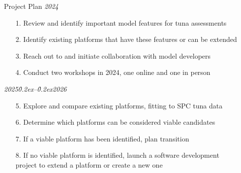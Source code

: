 \documentclass[aspectratio=169,fleqn]{beamer}
\begin{document}
\begin{frame}{Project Plan}\small
  \textit{2024}
  \begin{itemize}
    \item[1.] Review and identify important model features for tuna
    assessments\\[-1ex]
    \item[2.] Identify existing platforms that have these features or can be
    extended\\[-1ex]
    \item[3.] Reach out to and initiate collaboration with model
    developers\\[-1ex]
    \item[4.] Conduct two workshops in 2024, one online and one in person\\[4ex]
  \end{itemize}
  \textit{2025\h{0.2ex}--\h{0.2ex}2026}
  \begin{itemize}
    \item[5.] Explore and compare existing platforms, fitting to SPC tuna
    data\\[-1ex]
    \item[6.] Determine which platforms can be considered viable
    candidates\\[-1ex]
    \item[7.] If a viable platform has been identified, plan transition\\[-1ex]
    \item[8.] If no viable platform is identified, launch a software
    development\\[0.1ex]
    project to extend a platform or create a new one
  \end{itemize}
\end{frame}


\begin{frame}[plain]
\end{frame}

\end{document}
